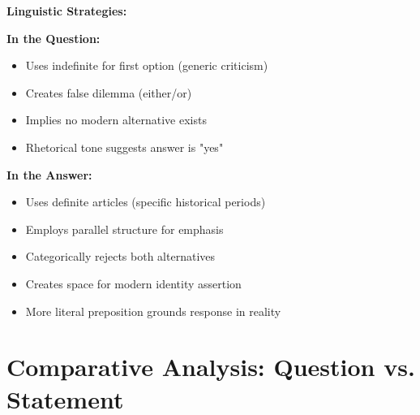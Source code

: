 \documentclass[letterpaper,12pt]{article}
\begin{document}
\begin{tcolorbox}[colback=boxcolor,colframe=accentcolor,title=\textbf{Question-Answer Dialogue},breakable]
\vspace{0.5em}
\textbf{Linguistic Strategies:}

\textbf{In the Question:}
\begin{itemize}
\item Uses indefinite for first option (generic criticism)
\item Creates false dilemma (either/or)
\item Implies no modern alternative exists
\item Rhetorical tone suggests answer is "yes"
\end{itemize}

\textbf{In the Answer:}
\begin{itemize}
\item Uses definite articles (specific historical periods)
\item Employs parallel structure for emphasis
\item Categorically rejects both alternatives
\item Creates space for modern identity assertion
\item More literal preposition grounds response in reality
\end{itemize}
\end{tcolorbox}

\section{Comparative Analysis: Question vs. Statement}
\end{document}
